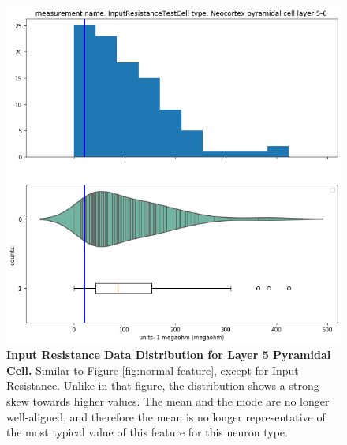 \begin{figure} 
    \begin{center} 
    \includegraphics[scale=0.8]{figures/skewed_distribution.png}
    \end{center}
    \caption[Example of Skewed Distribution]{\textbf{Input Resistance Data Distribution for Layer 5 Pyramidal Cell.} Similar to Figure \ref{fig:normal-feature}, except for Input Resistance.
    Unlike in that figure, the distribution shows a strong skew towards higher values.
    The mean and the mode are no longer well-aligned, and therefore the mean is no longer representative of the most typical value of this feature for this neuron type.}
    \label{fig:skewed-feature}
\end{figure}   

    
